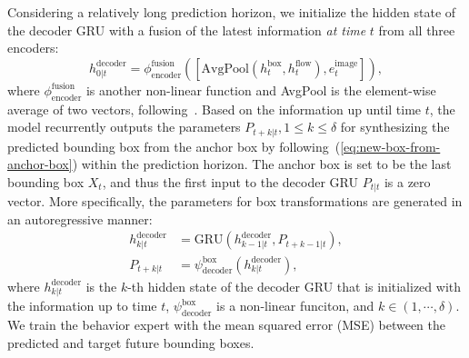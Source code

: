 Considering a relatively long prediction horizon, we initialize the hidden state of the decoder GRU with a fusion of the latest information \textit{at time} $t$ from all three encoders:
\begin{equation}
h_{0|t}^\text{decoder} = \phi_\text{encoder}^\text{fusion} \left( \left[\text{AvgPool}(h_t^\text{box}, h_t^\text{flow}), e_t^\text{image}\right] \right),
\end{equation}
where $\phi_\text{encoder}^\text{fusion}$ is another non-linear function and AvgPool is the element-wise average of two vectors, following~\cite{yao2022dota,yao2019unsupervised}. Based on the information up until time $t$, the model recurrently outputs the parameters $P_{t+k|t}, 1 \le k \le \delta$ for synthesizing the predicted bounding box from the anchor box by following~(\ref{eq:new-box-from-anchor-box}) within the prediction horizon. The anchor box is set to be the last bounding box $X_t$, and thus the first input to the decoder GRU $P_{t|t}$ is a zero vector. More specifically, the parameters for box transformations are generated in an autoregressive manner:
\begin{equation}
\begin{aligned}
h_{k|t}^\text{decoder} &= \text{GRU} \left( h_{k - 1|t}^\text{decoder}, P_{t + k - 1|t} \right), \\
P_{t + k|t} &= \psi_\text{decoder}^\text{box} (h_{k|t}^\text{decoder}),
\end{aligned}
\end{equation}
where $h_{k|t}^\text{decoder}$ is the $k$-th hidden state of the decoder GRU that is initialized with the information up to time $t$, $\psi_\text{decoder}^\text{box}$ is a non-linear funciton, and $k \in (1, \cdots, \delta)$. We train the behavior expert with the mean squared error (MSE) between the predicted and target future bounding boxes.

